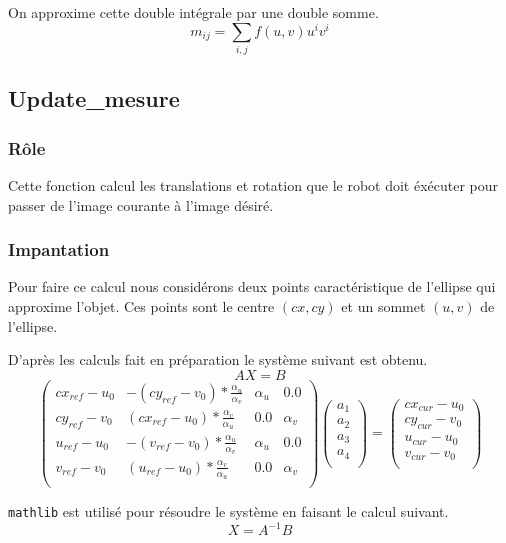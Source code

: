\documentclass[11pt,a4paper]{report}
\begin{document}
			On approxime cette double intégrale par une double somme.
			\[ m_{ij} = \sum_{i,j} f(u, v) u^i v^i \]

	\subsection*{Update\_mesure}
		\subsubsection{Rôle}
			Cette fonction calcul les translations et rotation que le robot doit éxécuter pour passer de l'image courante à l'image désiré.

		\subsubsection{Impantation}
			Pour faire ce calcul nous considérons deux points caractéristique de l'ellipse qui approxime l'objet. Ces points sont le centre $(cx, cy)$ et un sommet $(u,v)$ de l'ellipse.

			D'après les calculs fait en préparation le système suivant est obtenu.
			\[ A X=B \]
			\[
			\begin{pmatrix}
				cx_{ref}-u_0 & -(cy_{ref}-v_0)*\frac{\alpha_u}{\alpha_v} & \alpha_u & 0.0\\
				cy_{ref}-v_0 & (cx_{ref}-u_0)*\frac{\alpha_v}{\alpha_u} & 0.0 & \alpha_v\\
				u_{ref}-u_0 & -(v_{ref}-v_0)*\frac{\alpha_u}{\alpha_v} & \alpha_u & 0.0\\
				v_{ref}-v_0 & (u_{ref}-u_0)*\frac{\alpha_v}{\alpha_u} & 0.0 & \alpha_v\\
			\end{pmatrix}
			\begin{pmatrix}
				a_1\\
				a_2\\
				a_3\\
				a_4\\
			\end{pmatrix}
			=
			\begin{pmatrix}
				cx_{cur} - u_0\\
				cy_{cur} - v_0\\
				u_{cur} - u_0\\
				v_{cur} - v_0\\
			\end{pmatrix}
			\]

			\texttt{mathlib} est utilisé pour résoudre le système en faisant le calcul suivant.
			\[ X = A^{-1}B \]
\end{document}
